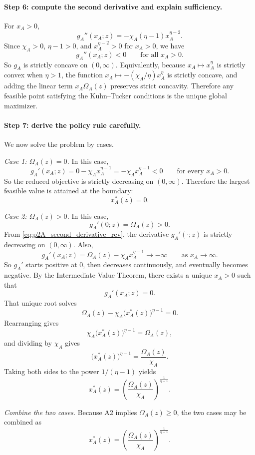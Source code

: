 \paragraph{Step 6: compute the second derivative and explain sufficiency.}
For $x_A>0$,
\begin{equation}
g_A''(x_A;z)=-\chi_A(\eta-1)x_A^{\eta-2}.
\label{eq:p2A_second_derivative_rev}
\end{equation}
Since $\chi_A>0$, $\eta-1>0$, and $x_A^{\eta-2}>0$ for $x_A>0$, we have
\[
g_A''(x_A;z)<0
\qquad\text{for all }x_A>0.
\]
So $g_A$ is strictly concave on $(0,\infty)$. Equivalently, because $x_A\mapsto x_A^\eta$ is strictly convex when $\eta>1$, the function $x_A\mapsto -(\chi_A/\eta)x_A^\eta$ is strictly concave, and adding the linear term $x_A\Omega_A(z)$ preserves strict concavity. Therefore any feasible point satisfying the Kuhn--Tucker conditions is the unique global maximizer.

\paragraph{Step 7: derive the policy rule carefully.}
We now solve the problem by cases.

\textit{Case 1: $\Omega_A(z)=0$.}
In this case,
\[
g_A'(x_A;z)=0-\chi_A x_A^{\eta-1}=-\chi_A x_A^{\eta-1}<0
\qquad\text{for every }x_A>0.
\]
So the reduced objective is strictly decreasing on $(0,\infty)$. Therefore the largest feasible value is attained at the boundary:
\[
x_A^*(z)=0.
\]

\textit{Case 2: $\Omega_A(z)>0$.}
In this case,
\[
g_A'(0;z)=\Omega_A(z)>0.
\]
From \eqref{eq:p2A_second_derivative_rev}, the derivative $g_A'(\cdot;z)$ is strictly decreasing on $(0,\infty)$. Also,
\[
g_A'(x_A;z)=\Omega_A(z)-\chi_A x_A^{\eta-1}\to -\infty
\qquad\text{as }x_A\to\infty.
\]
So $g_A'$ starts positive at $0$, then decreases continuously, and eventually becomes negative. By the Intermediate Value Theorem, there exists a unique $x_A>0$ such that
\[
g_A'(x_A;z)=0.
\]
That unique root solves
\[
\Omega_A(z)-\chi_A \bigl(x_A^*(z)\bigr)^{\eta-1}=0.
\]
Rearranging gives
\[
\chi_A \bigl(x_A^*(z)\bigr)^{\eta-1}=\Omega_A(z),
\]
and dividing by $\chi_A$ gives
\[
\bigl(x_A^*(z)\bigr)^{\eta-1}=\frac{\Omega_A(z)}{\chi_A}.
\]
Taking both sides to the power $1/(\eta-1)$ yields
\[
x_A^*(z)=\left(\frac{\Omega_A(z)}{\chi_A}\right)^{\frac{1}{\eta-1}}.
\]

\textit{Combine the two cases.}
Because A2 implies $\Omega_A(z)\ge 0$, the two cases may be combined as
\begin{equation}
x_A^*(z)=\left(\frac{\Omega_A(z)}{\chi_A}\right)^{\frac{1}{\eta-1}}.
\label{eq:p2A_policy_rev}
\end{equation}

